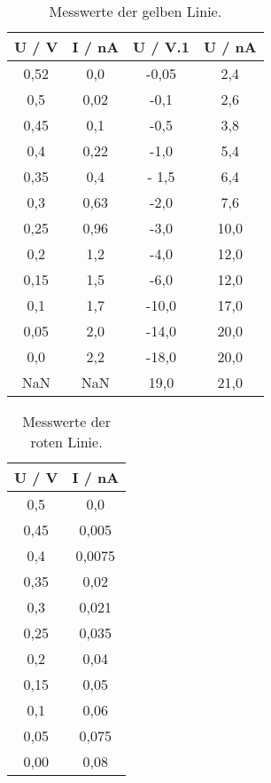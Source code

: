 \begin{table}
  \centering
  \caption{Messwerte der gelben Linie.}
  \label{tab:spek4}
  \begin{tabular}{c c c c}
    \toprule
    U / V & I / nA & U / V.1 & U / nA \\
    \midrule
     0,52 &    0,0 &   -0,05 &    2,4 \\
      0,5 &   0,02 &    -0,1 &    2,6 \\
     0,45 &    0,1 &    -0,5 &    3,8 \\
      0,4 &   0,22 &    -1,0 &    5,4 \\
     0,35 &    0,4 &   - 1,5 &    6,4 \\
      0,3 &   0,63 &    -2,0 &    7,6 \\
     0,25 &   0,96 &    -3,0 &   10,0 \\
      0,2 &    1,2 &    -4,0 &   12,0 \\
     0,15 &    1,5 &    -6,0 &   12,0 \\
      0,1 &    1,7 &   -10,0 &   17,0 \\
     0,05 &    2,0 &   -14,0 &   20,0 \\
      0,0 &    2,2 &   -18,0 &   20,0 \\
      NaN &    NaN &    19,0 &   21,0 \\
    \bottomrule
  \end{tabular}
\end{table}

\begin{table}
  \centering
  \caption{Messwerte der roten Linie.}
  \label{tab:spek5}
  \begin{tabular}{c c}
    \toprule
    U / V & I / nA \\
    \midrule
      0,5 &    0,0 \\
     0,45 &  0,005 \\
      0,4 & 0,0075 \\
     0,35 &   0,02 \\
      0,3 &  0,021 \\
     0,25 &  0,035 \\
      0,2 &   0,04 \\
     0,15 &   0,05 \\
      0,1 &   0,06 \\
     0,05 &  0,075 \\
     0,00 &   0,08 \\
    \bottomrule
    \end{tabular}
\end{table}